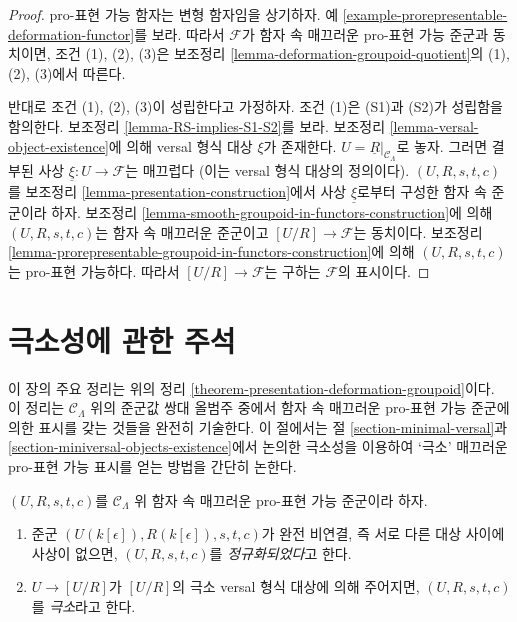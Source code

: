 \begin{proof}
pro-표현 가능 함자는 변형 함자임을 상기하자. 예
\ref{example-prorepresentable-deformation-functor}를 보라. 따라서
$\mathcal{F}$가 함자 속 매끄러운 pro-표현 가능 준군과 동치이면,
조건 (1), (2), (3)은 보조정리
\ref{lemma-deformation-groupoid-quotient}의 (1), (2), (3)에서 따른다.

\medskip\noindent
반대로 조건 (1), (2), (3)이 성립한다고 가정하자. 조건 (1)은
(S1)과 (S2)가 성립함을 함의한다. 보조정리
\ref{lemma-RS-implies-S1-S2}를 보라. 보조정리
\ref{lemma-versal-object-existence}에 의해 versal 형식 대상
$\xi$가 존재한다.
$U = \underline{R}|_{\mathcal{C}_\Lambda}$로 놓자. 그러면 결부된 사상
$\underline{\xi} : U \to \mathcal{F}$는 매끄럽다
(이는 versal 형식 대상의 정의이다).
$(U, R, s, t, c)$를 보조정리
\ref{lemma-presentation-construction}에서 사상 $\underline{\xi}$로부터
구성한 함자 속 준군이라 하자. 보조정리
\ref{lemma-smooth-groupoid-in-functors-construction}에 의해
$(U, R, s, t, c)$는 함자 속 매끄러운 준군이고
$[U/R] \to \mathcal{F}$는 동치이다. 보조정리
\ref{lemma-prorepresentable-groupoid-in-functors-construction}에 의해
$(U, R, s, t, c)$는 pro-표현 가능하다. 따라서
$[U/R] \to \mathcal{F}$는 구하는 $\mathcal{F}$의 표시이다.
\end{proof}





\section{극소성에 관한 주석}
\label{section-minimality}

\noindent
이 장의 주요 정리는 위의 정리
\ref{theorem-presentation-deformation-groupoid}이다.
이 정리는 $\mathcal{C}_\Lambda$ 위의 준군값 쌍대 올범주 중에서
함자 속 매끄러운 pro-표현 가능 준군에 의한 표시를 갖는 것들을
완전히 기술한다. 이 절에서는 절 \ref{section-minimal-versal}과
\ref{section-miniversal-objects-existence}에서 논의한 극소성을
이용하여 ‘극소’ 매끄러운 pro-표현 가능 표시를 얻는 방법을 간단히 논한다.

\begin{definition}
\label{definition-minimal-groupoid-in-functors}
$(U, R, s, t, c)$를 $\mathcal{C}_\Lambda$ 위 함자 속
매끄러운 pro-표현 가능 준군이라 하자.
\begin{enumerate}
\item 준군 $(U(k[\epsilon]), R(k[\epsilon]), s, t, c)$가
완전 비연결, 즉 서로 다른 대상 사이에 사상이 없으면,
$(U, R, s, t, c)$를 {\it 정규화되었다}고 한다.
\item $U \to [U/R]$가 $[U/R]$의 극소 versal 형식 대상에 의해
주어지면, $(U, R, s, t, c)$를 {\it 극소}라고 한다.
\end{enumerate}
\end{definition}


